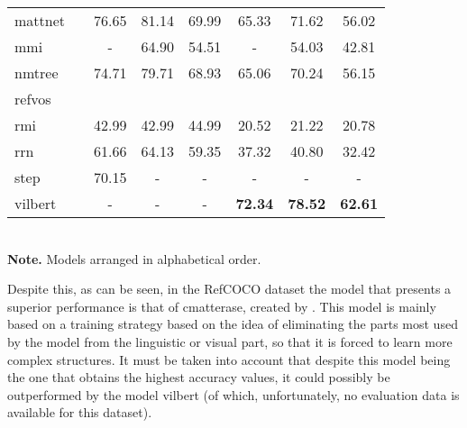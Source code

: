 \begin{table}[p]
\begin{tabular}{lc*6c}
    \acs{mattnet}    & \cite{yu18:mattn}                                            & 76.65          & 81.14          & 69.99          & 65.33          & 71.62          & 56.02          \\
    \acs{mmi}        & \cite{mao16:gener}                                           & -              & 64.90          & 54.51          & -              & 54.03          & 42.81          \\
    \acs{nmtree}     & \cite{liu19:learn_assem_neural_modul_tree}                   & 74.71          & 79.71          & 68.93          & 65.06          & 70.24          & 56.15          \\
    \acs{refvos}     & \cite{bellver20:refvos}                                      &                &                &                &                &                &                \\
    \acs{rmi}        & \cite{liu17:recur_multim_inter_refer_image_segmen}           & 42.99          & 42.99          & 44.99          & 20.52          & 21.22          & 20.78          \\
    \acs{rrn}        & \cite{li18:refer_image_segmen_recur_refin_networ}            & 61.66          & 64.13          & 59.35          & 37.32          & 40.80          & 32.42          \\
    \acs{step}       & \cite{chen19:see_throug_text_group_refer_image_segmen}       & 70.15          & -              & -              & -              & -              & -              \\
    \acs{vilbert}    & \cite{lu19:vilber}                                           & -              & -              & -              & \textbf{72.34} & \textbf{78.52} & \textbf{62.61} \\
    \bottomrule
  \end{tabular}\\[1.25ex]
  {\small\textbf{Note.} Models arranged in alphabetical order.}
\end{table}

Despite this, as can be seen, in the RefCOCO dataset the model that presents a
superior performance is that of \gls{cmatterase}, created by
. This model is
mainly based on a training strategy based on the idea of eliminating the parts
most used by the model from the linguistic or visual part, so that it is forced
to learn more complex structures. It must be taken into account that despite
this model being the one that obtains the highest accuracy values, it could
possibly be outperformed by the model \acs{vilbert} (of which, unfortunately,
no evaluation data is available for this dataset).

